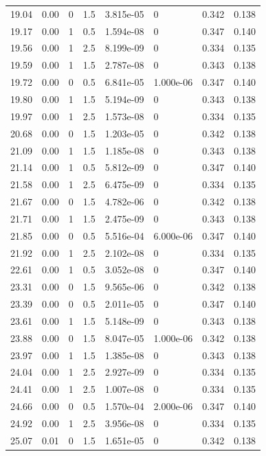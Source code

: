 \documentclass[preview]{standalone}
\begin{document}
{{{\begin{tabular}{L{1.2cm}C{1.2cm} C{0.3cm}C{0.5cm} C{1.4cm}C{1.4cm} C{1.4cm}C{1.4cm}}
  19.04  &  0.00  & 0     & 1.5 &  3.815e-05  & 0  & 0.342 &  0.138   \\ 
  19.17  &  0.00  & 1     & 0.5 &  1.594e-08  & 0  & 0.347 &  0.140   \\ 
  19.56  &  0.00  & 1     & 2.5 &  8.199e-09  & 0  & 0.334 &  0.135   \\ 
  19.59  &  0.00  & 1     & 1.5 &  2.787e-08  & 0  & 0.343 &  0.138   \\ 
  19.72  &  0.00  & 0     & 0.5 &  6.841e-05  & 1.000e-06  & 0.347 &  0.140   \\ 
  19.80  &  0.00  & 1     & 1.5 &  5.194e-09  & 0  & 0.343 &  0.138   \\ 
  19.97  &  0.00  & 1     & 2.5 &  1.573e-08  & 0  & 0.334 &  0.135   \\ 
  20.68  &  0.00  & 0     & 1.5 &  1.203e-05  & 0  & 0.342 &  0.138   \\ 
  21.09  &  0.00  & 1     & 1.5 &  1.185e-08  & 0  & 0.343 &  0.138   \\ 
  21.14  &  0.00  & 1     & 0.5 &  5.812e-09  & 0  & 0.347 &  0.140   \\ 
  21.58  &  0.00  & 1     & 2.5 &  6.475e-09  & 0  & 0.334 &  0.135   \\ 
  21.67  &  0.00  & 0     & 1.5 &  4.782e-06  & 0  & 0.342 &  0.138   \\ 
  21.71  &  0.00  & 1     & 1.5 &  2.475e-09  & 0  & 0.343 &  0.138   \\ 
  21.85  &  0.00  & 0     & 0.5 &  5.516e-04  & 6.000e-06  & 0.347 &  0.140   \\ 
  21.92  &  0.00  & 1     & 2.5 &  2.102e-08  & 0  & 0.334 &  0.135   \\ 
  22.61  &  0.00  & 1     & 0.5 &  3.052e-08  & 0  & 0.347 &  0.140   \\ 
  23.31  &  0.00  & 0     & 1.5 &  9.565e-06  & 0  & 0.342 &  0.138   \\ 
  23.39  &  0.00  & 0     & 0.5 &  2.011e-05  & 0  & 0.347 &  0.140   \\ 
  23.61  &  0.00  & 1     & 1.5 &  5.148e-09  & 0  & 0.343 &  0.138   \\ 
  23.88  &  0.00  & 0     & 1.5 &  8.047e-05  & 1.000e-06  & 0.342 &  0.138   \\ 
  23.97  &  0.00  & 1     & 1.5 &  1.385e-08  & 0  & 0.343 &  0.138   \\ 
  24.04  &  0.00  & 1     & 2.5 &  2.927e-09  & 0  & 0.334 &  0.135   \\ 
  24.41  &  0.00  & 1     & 2.5 &  1.007e-08  & 0  & 0.334 &  0.135   \\ 
  24.66  &  0.00  & 0     & 0.5 &  1.570e-04  & 2.000e-06  & 0.347 &  0.140   \\ 
  24.92  &  0.00  & 1     & 2.5 &  3.956e-08  & 0  & 0.334 &  0.135   \\ 
  25.07  &  0.01  & 0     & 1.5 &  1.651e-05  & 0  & 0.342 &  0.138   \\ 
\hline 
\end{tabular} 

}}}
\end{document}
